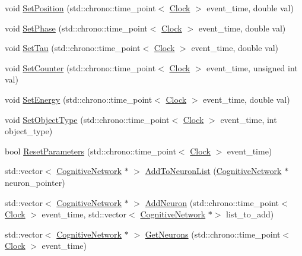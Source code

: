 \begin{DoxyCompactItemize}
void \hyperlink{class_orbital_a16ff46f7e720f2f7aed332585310a9b8}{Set\+Position} (std\+::chrono\+::time\+\_\+point$<$ \hyperlink{universe_8h_a0ef8d951d1ca5ab3cfaf7ab4c7a6fd80}{Clock} $>$ event\+\_\+time, double val)
\item 
void \hyperlink{class_orbital_ac1c58fcb56e4d5c19c4ab39cc09c88ad}{Set\+Phase} (std\+::chrono\+::time\+\_\+point$<$ \hyperlink{universe_8h_a0ef8d951d1ca5ab3cfaf7ab4c7a6fd80}{Clock} $>$ event\+\_\+time, double val)
\item 
void \hyperlink{class_orbital_afd09baa67f1a9bff08c74dcf60e1398a}{Set\+Tau} (std\+::chrono\+::time\+\_\+point$<$ \hyperlink{universe_8h_a0ef8d951d1ca5ab3cfaf7ab4c7a6fd80}{Clock} $>$ event\+\_\+time, double val)
\item 
void \hyperlink{class_orbital_ae2a2fb06700d1d68501b0cbdea87cc08}{Set\+Counter} (std\+::chrono\+::time\+\_\+point$<$ \hyperlink{universe_8h_a0ef8d951d1ca5ab3cfaf7ab4c7a6fd80}{Clock} $>$ event\+\_\+time, unsigned int val)
\item 
void \hyperlink{class_orbital_a20b0f4d549fd9024df89603a5adcc214}{Set\+Energy} (std\+::chrono\+::time\+\_\+point$<$ \hyperlink{universe_8h_a0ef8d951d1ca5ab3cfaf7ab4c7a6fd80}{Clock} $>$ event\+\_\+time, double val)
\item 
void \hyperlink{class_orbital_afd0dfd382d4bf7d9fbace315bd37fa85}{Set\+Object\+Type} (std\+::chrono\+::time\+\_\+point$<$ \hyperlink{universe_8h_a0ef8d951d1ca5ab3cfaf7ab4c7a6fd80}{Clock} $>$ event\+\_\+time, int object\+\_\+type)
\item 
bool \hyperlink{class_orbital_acc6137a5a79be91a255f685a2f065330}{Reset\+Parameters} (std\+::chrono\+::time\+\_\+point$<$ \hyperlink{universe_8h_a0ef8d951d1ca5ab3cfaf7ab4c7a6fd80}{Clock} $>$ event\+\_\+time)
\item 
std\+::vector$<$ \hyperlink{class_cognitive_network}{Cognitive\+Network} $\ast$ $>$ \hyperlink{class_orbital_a44230cebc40357d186c442bfac2507a4}{Add\+To\+Neuron\+List} (\hyperlink{class_cognitive_network}{Cognitive\+Network} $\ast$neuron\+\_\+pointer)
\item 
std\+::vector$<$ \hyperlink{class_cognitive_network}{Cognitive\+Network} $\ast$ $>$ \hyperlink{class_orbital_a57480cdd63dd1bf731864f513767800d}{Add\+Neuron} (std\+::chrono\+::time\+\_\+point$<$ \hyperlink{universe_8h_a0ef8d951d1ca5ab3cfaf7ab4c7a6fd80}{Clock} $>$ event\+\_\+time, std\+::vector$<$ \hyperlink{class_cognitive_network}{Cognitive\+Network} $\ast$$>$ list\+\_\+to\+\_\+add)
\item 
std\+::vector$<$ \hyperlink{class_cognitive_network}{Cognitive\+Network} $\ast$ $>$ \hyperlink{class_orbital_a7d7e4b7cb0d009a5e7224b6f758d7b6b}{Get\+Neurons} (std\+::chrono\+::time\+\_\+point$<$ \hyperlink{universe_8h_a0ef8d951d1ca5ab3cfaf7ab4c7a6fd80}{Clock} $>$ event\+\_\+time)
$$
\end{DoxyCompactItemize}
